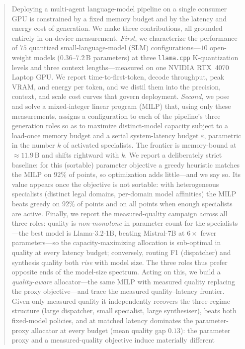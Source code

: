 \documentclass[11pt]{article}
\newcommand{\eps}{\varepsilon}
\begin{document}
\begin{abstract}
\noindent
Deploying a multi-agent language-model pipeline on a single consumer GPU is
constrained by a fixed memory budget and by the latency and energy cost of
generation. We make three contributions, all grounded entirely in on-device
measurement. \emph{First}, we characterize the performance of $75$ quantized
small-language-model (SLM) configurations---$10$ open-weight models
($0.36$--$7.2$\,B parameters) at three \texttt{llama.cpp} K-quantization levels
and three context lengths---measured on one NVIDIA RTX~4070 Laptop GPU. We
report time-to-first-token, decode throughput, peak VRAM, and energy per token,
and we distil them into the precision, context, and scale cost curves that
govern deployment. \emph{Second}, we pose and solve
a mixed-integer linear program (MILP) that, using only these measurements,
assigns a configuration to each of the pipeline's three generation roles so as to
maximize distinct-model capacity subject to a load-once memory budget and a
serial system-latency budget $\eps$, parametric in the number $k$ of activated
specialists. The frontier is memory-bound at ${\approx}11.9$\,B and shifts rightward
with $k$. We report a deliberately strict
baseline: for this (sortable) parameter objective a greedy heuristic matches the
MILP on $92\%$ of points, so optimization adds little---and we say so. Its value
appears once the objective is not sortable: with heterogeneous specialists
(distinct legal domains, per-domain model affinities) the MILP beats greedy on
$92\%$ of points and on all points when enough specialists are active. Finally,
we report the measured-quality campaign across all three roles: quality is
\emph{non-monotone} in parameter count for the specialists---the best model is
Llama-3.2-1B, beating Mistral-7B at $6\times$ fewer parameters---so the
capacity-maximizing allocation is sub-optimal in quality at every latency budget;
conversely, routing F1 (dispatcher) and synthesis quality both \emph{rise} with
model size. The three roles thus prefer opposite ends of the model-size spectrum.
Acting on this, we build a \emph{quality-aware} allocator---the same MILP with
measured quality replacing the proxy objective---and trace the measured
quality--latency frontier. Given only measured quality it independently recovers
the three-regime structure (large dispatcher, small specialist, large
synthesiser), beats both fixed-model policies, and at matched latency dominates
the parameter-proxy allocator at every budget (mean quality gap $0.13$): the
parameter proxy and a measured-quality objective induce materially different

\end{abstract}
\end{document}
